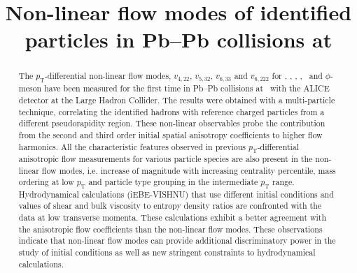 \documentclass[ALICE,manyauthors]{cernphprep}
\begin{document}


\begin{titlepage}

\title{Non-linear flow modes of identified particles in Pb--Pb collisions at \sNN}


\begin{abstract}
\noindent The $p_{\mathrm{T}}$-differential non-linear flow modes, $v_{4,22}$, $v_{5,32}$, $v_{6,33}$ and $v_{6,222}$ for \pion, \kaon, \Ks, \proton, \lambdas~and $\phi$-meson have been measured for the first time in Pb--Pb collisions at \sNN~with the ALICE detector at the Large Hadron Collider. The results were obtained with a multi-particle technique, correlating the identified hadrons with reference charged particles from a different pseudorapidity region. %
These non-linear observables probe the contribution from the second and third order initial spatial anisotropy coefficients to higher flow harmonics. All the characteristic features observed in previous $p_{\mathrm{T}}$-differential anisotropic flow measurements for various particle species are also present in the non-linear flow modes, i.e. increase of magnitude with increasing centrality percentile, mass ordering at low $p_{\mathrm{T}}$ and particle type grouping in the intermediate $p_{\mathrm{T}}$ range. Hydrodynamical calculations (iEBE-VISHNU) that use different initial conditions and values of shear and bulk viscosity to entropy density ratios are confronted with the data at low transverse momenta. These calculations exhibit a better agreement with the anisotropic flow coefficients than the non-linear flow modes. These observations indicate that non-linear flow modes can provide additional discriminatory power in the study of initial conditions as well as new stringent constraints to hydrodynamical calculations.



\end{abstract}
\end{titlepage}
\end{document}
